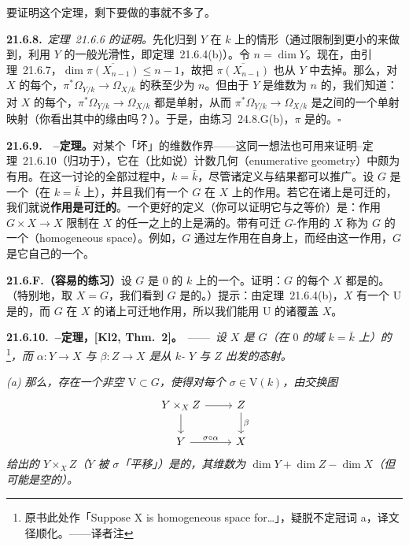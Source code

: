 要证明这个定理，剩下要做的事就不多了。

\textbf{21.6.8.}\ \emph{\mbox{定理~21.6.6} 的证明。}\quad 先化归到 $Y$ 在 $k$ 上\trSmooth{}的情形（通过限制到更小的\trOpenSet{}来做到，利用 $Y$ 的一般光滑性，即\mbox{定理~21.6.4(b)}）。令 $n=\dim Y$。现在，由\mbox{引理~21.6.7}，$\dim\overline{\pi(X_{n-1})}\le n-1$，故把 $\overline{\pi(X_{n-1})}$ 也从 $Y$ 中去掉。那么，对 $X$ 的每个\trClosedPoint，$\pi^*\Omega_{Y/k}\to\Omega_{X/k}$ 的秩至少为 $n$。但由于 $Y$ 是维数为 $n$ 的\trRegular\trScheme，我们知道：对 $X$ 的每个\trClosedPoint，$\pi^*\Omega_{Y/k}\to\Omega_{X/k}$ 都是单射，从而 $\pi^*\Omega_{Y/k}\to\Omega_{X/k}$ 是\trSheaf{}之间的一个单射映射（你看出其中的缘由吗？）。于是，由\mbox{练习~24.8.G(b)}，$\pi$ 是\trSmooth{}的。\hfill$\square$

\textbf{21.6.9.}\ \extrahard\ \textbf{\trKleiman--\trBertini{}定理。}\quad 对某个「坏\trLocus」的维数作界——这同一想法也可用来证明\mbox{\trKleiman--\trBertini{}定理~21.6.10}（归功于\trKleiman），它在（比如说）计数几何（enumerative geometry）中颇为有用。在这一讨论的全部过程中，$k=\bar{k}$，尽管诸定义与结果都可以推广。设 $G$ 是一个\trGroupVariety（在 $k=\bar{k}$ 上），并且我们有一个 $G$ 在\trVariety{} $X$ 上的作用。若它在诸\trClosedPoint{}上是可迁的，我们就说\textbf{作用是可迁的}。一个更好的定义（你可以证明它与之等价）是：作用\trMorphism{} $G\times X\to X$ 限制在 $X$ 的任一\trClosedPoint{}之上的\trFiber{}上是满的。带有可迁 $G$-作用的\trVariety{} $X$ 称为 $G$ 的一个\textbf{\trHomogeneousSpace}（homogeneous space）。例如，$G$ 通过左\trTranslation{}作用在自身上，而经由这一作用，$G$ 是它自己的一个\trHomogeneousSpace。

\textbf{21.6.F.（容易的练习）}\quad 设 $G$ 是\trCharacteristic{} $0$ 的\trAlgClosedField{} $k$ 上的一个\trGroupVariety。证明：$G$ 的每个\trHomogeneousSpace{} $X$ 都是\trSmooth{}的。（特别地，取 $X=G$，我们看到 $G$ 是\trSmooth{}的。）提示：由\mbox{定理~21.6.4(b)}，$X$ 有一个\trDense\trOpenSet{} $\mathrm{U}$ 是\trSmooth{}的，而 $G$ 在 $X$ 的诸\trClosedPoint{}上可迁地作用，所以我们能用 $\mathrm{U}$ 的诸\trTranslation{}覆盖 $X$。

\textbf{21.6.10.\ \trKleiman--\trBertini{}定理，[Kl2, Thm.~2]。}\ ——\ \emph{设 $X$ 是\trGroupVariety{} $G$（在\trCharacteristic{} $0$ 的域 $k=\bar{k}$ 上）的\trHomogeneousSpace}\footnote{原书此处作「Suppose X is homogeneous space for\ldots」，疑脱不定冠词 a，译文径顺化。——译者注}\emph{，而 $\alpha\colon Y\to X$ 与 $\beta\colon Z\to X$ 是从\trSmooth{} $k$-\trVariety{} $Y$ 与 $Z$ 出发的态射。}

\emph{(a) 那么，存在一个非空\trOpenSubset{} $\mathrm{V}\subset G$，使得对每个 $\sigma\in\mathrm{V}(k)$，由交换图}
\[
\begin{tikzcd}
Y\times_X Z \arrow[r] \arrow[d] & Z \arrow[d, "\beta"] \\
Y \arrow[r, "\sigma\circ\alpha"] & X
\end{tikzcd}
\]
\emph{给出的 $Y\times_X Z$（$Y$ 被 $\sigma$「平移」）是\trSmooth{}的，其维数为 $\dim Y+\dim Z-\dim X$（但可能是空的）。}

